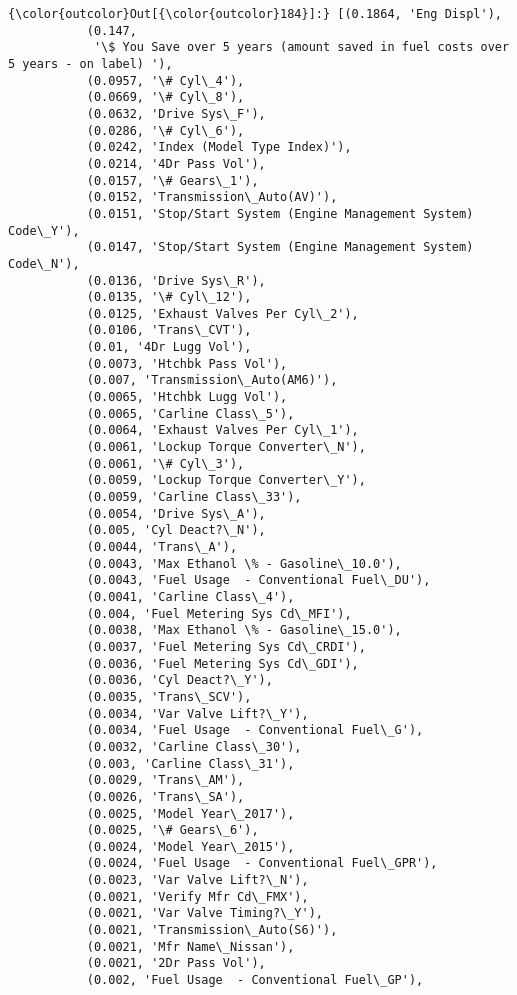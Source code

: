 \documentclass[11pt]{article}
\begin{document}
            \begin{Verbatim}[commandchars=\\\{\}]
{\color{outcolor}Out[{\color{outcolor}184}]:} [(0.1864, 'Eng Displ'),
           (0.147,
            '\$ You Save over 5 years (amount saved in fuel costs over 5 years - on label) '),
           (0.0957, '\# Cyl\_4'),
           (0.0669, '\# Cyl\_8'),
           (0.0632, 'Drive Sys\_F'),
           (0.0286, '\# Cyl\_6'),
           (0.0242, 'Index (Model Type Index)'),
           (0.0214, '4Dr Pass Vol'),
           (0.0157, '\# Gears\_1'),
           (0.0152, 'Transmission\_Auto(AV)'),
           (0.0151, 'Stop/Start System (Engine Management System) Code\_Y'),
           (0.0147, 'Stop/Start System (Engine Management System) Code\_N'),
           (0.0136, 'Drive Sys\_R'),
           (0.0135, '\# Cyl\_12'),
           (0.0125, 'Exhaust Valves Per Cyl\_2'),
           (0.0106, 'Trans\_CVT'),
           (0.01, '4Dr Lugg Vol'),
           (0.0073, 'Htchbk Pass Vol'),
           (0.007, 'Transmission\_Auto(AM6)'),
           (0.0065, 'Htchbk Lugg Vol'),
           (0.0065, 'Carline Class\_5'),
           (0.0064, 'Exhaust Valves Per Cyl\_1'),
           (0.0061, 'Lockup Torque Converter\_N'),
           (0.0061, '\# Cyl\_3'),
           (0.0059, 'Lockup Torque Converter\_Y'),
           (0.0059, 'Carline Class\_33'),
           (0.0054, 'Drive Sys\_A'),
           (0.005, 'Cyl Deact?\_N'),
           (0.0044, 'Trans\_A'),
           (0.0043, 'Max Ethanol \% - Gasoline\_10.0'),
           (0.0043, 'Fuel Usage  - Conventional Fuel\_DU'),
           (0.0041, 'Carline Class\_4'),
           (0.004, 'Fuel Metering Sys Cd\_MFI'),
           (0.0038, 'Max Ethanol \% - Gasoline\_15.0'),
           (0.0037, 'Fuel Metering Sys Cd\_CRDI'),
           (0.0036, 'Fuel Metering Sys Cd\_GDI'),
           (0.0036, 'Cyl Deact?\_Y'),
           (0.0035, 'Trans\_SCV'),
           (0.0034, 'Var Valve Lift?\_Y'),
           (0.0034, 'Fuel Usage  - Conventional Fuel\_G'),
           (0.0032, 'Carline Class\_30'),
           (0.003, 'Carline Class\_31'),
           (0.0029, 'Trans\_AM'),
           (0.0026, 'Trans\_SA'),
           (0.0025, 'Model Year\_2017'),
           (0.0025, '\# Gears\_6'),
           (0.0024, 'Model Year\_2015'),
           (0.0024, 'Fuel Usage  - Conventional Fuel\_GPR'),
           (0.0023, 'Var Valve Lift?\_N'),
           (0.0021, 'Verify Mfr Cd\_FMX'),
           (0.0021, 'Var Valve Timing?\_Y'),
           (0.0021, 'Transmission\_Auto(S6)'),
           (0.0021, 'Mfr Name\_Nissan'),
           (0.0021, '2Dr Pass Vol'),
           (0.002, 'Fuel Usage  - Conventional Fuel\_GP'),

\end{Verbatim}
\end{document}
